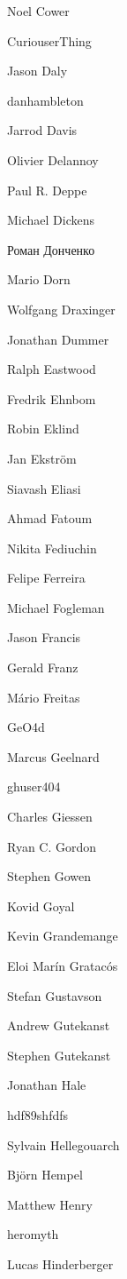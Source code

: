 \begin{DoxyItemize}
\item Noel Cower
\item Curiouser\+Thing
\item Jason Daly
\item danhambleton
\item Jarrod Davis
\item Olivier Delannoy
\item Paul R. Deppe
\item Michael Dickens
\item Роман Донченко
\item Mario Dorn
\item Wolfgang Draxinger
\item Jonathan Dummer
\item Ralph Eastwood
\item Fredrik Ehnbom
\item Robin Eklind
\item Jan Ekström
\item Siavash Eliasi
\item Ahmad Fatoum
\item Nikita Fediuchin
\item Felipe Ferreira
\item Michael Fogleman
\item Jason Francis
\item Gerald Franz
\item Mário Freitas
\item Ge\+O4d
\item Marcus Geelnard
\item ghuser404
\item Charles Giessen
\item Ryan C. Gordon
\item Stephen Gowen
\item Kovid Goyal
\item Kevin Grandemange
\item Eloi Marín Gratacós
\item Stefan Gustavson
\item Andrew Gutekanst
\item Stephen Gutekanst
\item Jonathan Hale
\item hdf89shfdfs
\item Sylvain Hellegouarch
\item Björn Hempel
\item Matthew Henry
\item heromyth
\item Lucas Hinderberger

\end{DoxyItemize}
